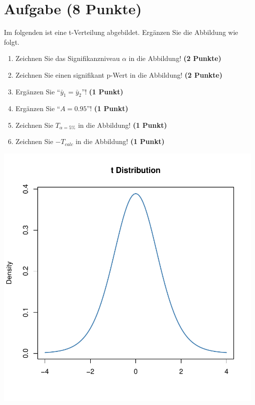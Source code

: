 \documentclass[a4paper, 10pt]{scrartcl}\usepackage[]{graphicx}\usepackage[]{xcolor}
\makeatletter
\def\maxwidth{ %
  \ifdim\Gin@nat@width>\linewidth
    \linewidth
  \else
    \Gin@nat@width
  \fi
}
\makeatother
\begin{document}
 
\clearpage

\section{Aufgabe \hfill (8 Punkte)}



Im folgenden ist eine t-Verteilung abgebildet. Erg{\"a}nzen Sie die Abbildung wie folgt.

\begin{enumerate}
\item Zeichnen Sie das Signifikanzniveau $\alpha$ in die Abbildung! \textbf{(2 Punkte)} 
\item Zeichnen Sie einen signifikant p-Wert in die Abbildung! \textbf{(2 Punkte)} 
\item Erg{\"a}nzen Sie "`$\bar{y}_1 = \bar{y}_2$"'! \textbf{(1 Punkt)} 
\item Erg{\"a}nzen Sie "`$A = 0.95$"'! \textbf{(1 Punkt)}
\item Zeichnen Sie $T_{\alpha=5\%}$ in die Abbildung! \textbf{(1 Punkt)} 
\item Zeichnen Sie $-T_{calc}$ in die Abbildung! \textbf{(1 Punkt)} 
\end{enumerate}



{\centering \includegraphics[width=\maxwidth]{img/statistisches-testen-3-1} 

}
\end{document}
